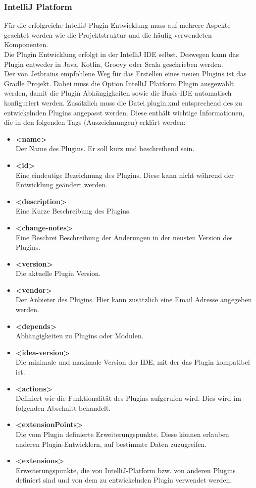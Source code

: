 \subsubsection{IntelliJ Platform}
Für die erfolgreiche IntelliJ Plugin Entwicklung muss auf mehrere Aspekte geachtet werden wie die Projektstruktur und die häufig verwendeten Komponenten.\\
Die Plugin Entwicklung erfolgt in der IntelliJ IDE selbst. Deswegen kann das Plugin entweder in Java, Kotlin, Groovy oder Scala geschrieben werden.\\
Der von Jetbrains empfohlene Weg für das Erstellen eines neuen Plugins ist das Gradle Projekt. Dabei muss die Option IntelliJ Platform Plugin ausgewählt werden, damit die Plugin Abhängigkeiten sowie die Basis-IDE automatisch konfiguriert werden. Zusätzlich muss die Datei plugin.xml entsprechend des zu entwickelnden Plugins angepasst werden. Diese enthält wichtige Informationen, die in den folgenden Tags (Auszeichnungen) erklärt werden:
\begin{itemize}
	\item \textbf{<name>} \\
	Der Name des Plugins. Er soll kurz und beschreibend sein.
	\item \textbf{<id>} \\
	Eine eindeutige Bezeichnung des Plugins. Diese kann nicht während der Entwicklung geändert werden.
	\item \textbf{<description>} \\
	Eine Kurze Beschreibung des Plugins.
	\item \textbf{<change-notes>} \\
	Eine Beschrei Beschreibung der Änderungen in der neusten Version des Plugins.
	\item \textbf{<version>} \\
	Die aktuelle Plugin Version.
	\item \textbf{<vendor>} \\
	Der Anbieter des Plugins. Hier kann zusätzlich eine Email Adresse angegeben werden.
	\item \textbf{<depends>} \\
	Abhängigkeiten zu Plugins oder Modulen.
	\item \textbf{<idea-version>} \\
	Die minimale und maximale Version der IDE, mit der das Plugin kompatibel ist.
	\item \textbf{<actions>} \\
	Definiert wie die Funktionalität des Plugins aufgerufen wird. Dies wird im folgenden Abschnitt behandelt.
	\item \textbf{<extensionPoints>} \\
	Die vom Plugin definierte Erweiterungspunkte. Diese können erlauben anderen Plugin-Entwicklern, auf bestimmte Daten zuzugreifen. 
	\item \textbf{<extensions>} \\
	Erweiterungspunkte, die von IntelliJ-Platform bzw. von anderen Plugins definiert sind und von dem zu entwickelnden Plugin verwendet werden.
\end{itemize}
